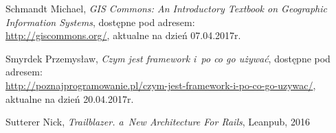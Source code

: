 \documentclass[printmode]{mgr}
\begin{document}
\begin{thebibliography}{inz}
  Schmandt Michael, \emph{GIS Commons: An Introductory Textbook on Geographic Information Systems}, dostępne pod adresem:\\
  \url{http://giscommons.org/}, aktualne na dzień 07.04.2017r.

  Smyrdek Przemysław, \emph{Czym jest framework i~po co go używać}, dostępne pod adresem:\\
  \url{http://poznajprogramowanie.pl/czym-jest-framework-i-po-co-go-uzywac/}, aktualne na dzień 20.04.2017r.
  
  Sutterer Nick, \emph{Trailblazer. a~New Architecture For Rails}, Leanpub, 2016
  
 
\end{thebibliography}
\end{document}
